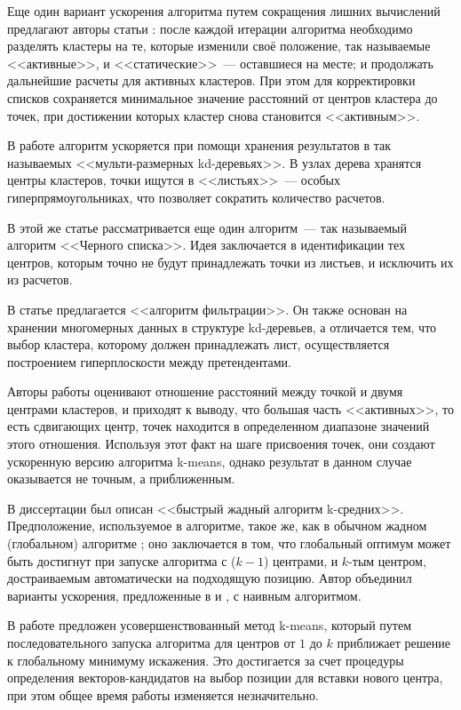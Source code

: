 Еще один вариант ускорения алгоритма путем сокращения лишних вычислений предлагают авторы статьи \cite{fastkm}: после каждой итерации алгоритма необходимо разделять кластеры на те, которые изменили своё положение, так называемые <<активные>>, и <<статические>>~--- оставшиеся на месте; и продолжать дальнейшие расчеты для активных кластеров. При этом для корректировки списков сохраняется минимальное значение расстояний от центров кластера до точек, при достижении которых кластер снова становится <<активным>>.

В работе \cite{mrkd} алгоритм ускоряется при помощи хранения результатов в так называемых <<мульти-размерных kd-деревьях>>. В узлах дерева хранятся центры кластеров, точки ищутся в <<листьях>>~--- особых гиперпрямоугольниках, что позволяет сократить количество расчетов.

В этой же статье рассматривается еще один алгоритм~--- так называемый алгоритм <<Черного списка>>. Идея заключается в идентификации тех центров, которым точно не будут принадлежать точки из листьев, и исключить их из расчетов.

В статье \cite{kanungo} предлагается <<алгоритм фильтрации>>. Он также основан на хранении многомерных данных в структуре kd-деревьев, а отличается тем, что выбор кластера, которому должен принадлежать лист, осуществляется построением гиперплоскости между претендентами.

Авторы работы \cite{approxkm} оценивают отношение расстояний между точкой и двумя центрами кластеров, и приходят к выводу, что большая часть <<активных>>, то есть сдвигающих центр, точек находится в определенном диапазоне значений этого отношения. Используя этот факт на шаге присвоения точек, они создают ускоренную версию алгоритма k-means, однако результат в данном случае оказывается не точным, а приближенным.

В диссертации \cite{hussein} был описан <<быстрый жадный алгоритм k-средних>>. Предположение, используемое в алгоритме, такое же, как в обычном жадном (глобальном) алгоритме \cite{likas}; оно заключается в том, что глобальный оптимум может быть достигнут при запуске алгоритма с (\( k-1 \)) центрами, и \( k \)-тым центром, достраиваемым автоматически на подходящую позицию. Автор объединил варианты ускорения, предложенные в \cite{mrkd} и \cite{kanungo}, с наивным алгоритмом.

В работе \cite{hybrid} предложен усовершенствованный метод k-means, который путем последовательного запуска алгоритма для центров от \( 1 \) до \( k \) приближает решение к глобальному минимуму искажения. Это достигается за счет процедуры определения векторов-кандидатов на выбор позиции для вставки нового центра, при этом общее время работы изменяется незначительно.

